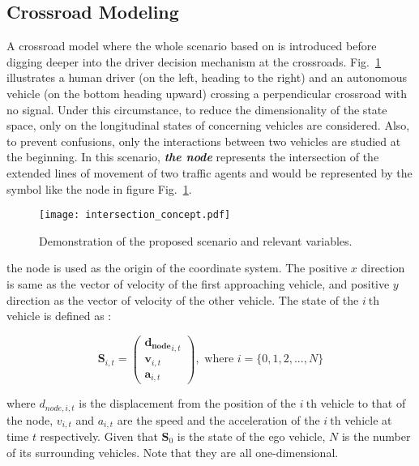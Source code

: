 \subsection{Crossroad Modeling}
\label{sub:crossroad}
A crossroad model where the whole scenario based on is introduced before digging deeper into the driver decision mechanism at the crossroads. Fig.~\ref{fig:model_demo} illustrates a human driver (on the left, heading to the right) and an autonomous vehicle (on the bottom heading upward) crossing a perpendicular crossroad with no signal. Under this circumstance, to reduce the dimensionality of the state space, only on the longitudinal states of concerning vehicles are considered. Also, to prevent confusions, only the interactions between two vehicles are studied at the beginning. In this scenario, \textbf{\emph {the node}} represents the intersection of the extended lines of movement of two traffic agents and would be represented by the symbol like the node in figure Fig.~\ref{fig:model_demo}. 

\begin{figure}[t]
\begin{center}
\texttt{[image: intersection\_concept.pdf]}
\end{center}
\caption{Demonstration of the proposed scenario and relevant variables.}
\label{fig:model_demo} 
\end{figure}

the node is used as the origin of the coordinate system. The positive $x$ direction is same as the vector of velocity of the first approaching vehicle, and positive $y$ direction as the vector of velocity of the other vehicle. The state of the $i~\text{th}$ vehicle is defined as : 

\begin{equation}
\mathbf{S}_{i,t} = \left( \begin{array}{c} \mathbf{d_{node}}_{i,t} \\ \mathbf{v}_{i,t} \\ \mathbf{a}_{i,t} \end{array} \right), \mbox{ where }  i=\{0, 1, 2, ..., N\} 
\label{eq:state}
\end{equation}

\noindent where $d_{node, i, t}$ is the displacement from the position of the $i~\text{th}$ vehicle to that of the node, $v_{i, t}$ and $a_{i, t}$ are the speed and the acceleration of the $i~\text{th}$ vehicle at time $t$ respectively. Given that $\mathbf{S}_{0}$ is the state of the ego vehicle, $N$ is the number of its surrounding vehicles. Note that they are all one-dimensional. 


